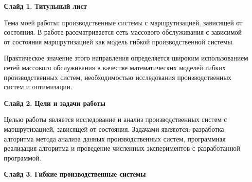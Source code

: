 \documentclass[a4paper,14pt]{extarticle}
\theoremstyle{note}
\begin{document}
\textbf{Слайд 1. Титульный лист}

Тема моей работы: производственные системы с маршрутизацией, зависящей от состояния. В работе рассматривается сеть массового обслуживания с зависимой от состояния маршрутизацией как модель гибкой производственной системы.

Практическое значение этого направления определяется широким использованием сетей массового обслуживания в качестве математических моделей гибких производственных систем, необходимостью исследования производственных систем и оптимизации.

\textbf{Слайд 2. Цели и задачи работы}

Целью работы является исследование и анализ производственных систем с маршрутизацией, зависящей от состояния. Задачами являются: разработка алгоритма метода анализа данных производственных систем, программная реализация алгоритма и проведение численных экспериментов с разработанной программой.


\textbf{Слайд 3. Гибкие производственные системы}
\end{document}
